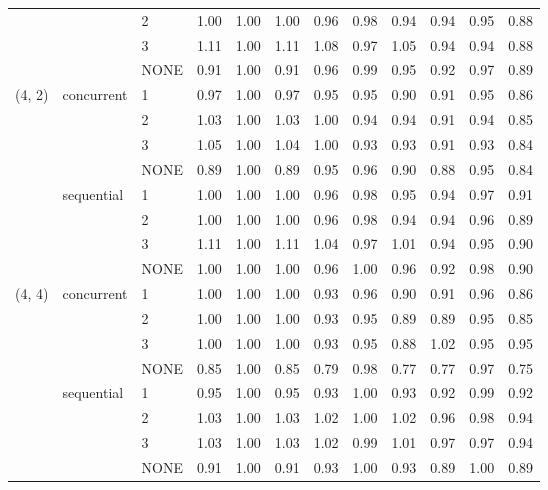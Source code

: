 \begin{tabular}{lllrrrrrrrrr}
       &            & 2 &     1.00 &     1.00 &  1.00 &     0.96 &     0.98 &  0.94 &     0.94 &     0.95 &  0.88 \\
       &            & 3 &     1.11 &     1.00 &  1.11 &     1.08 &     0.97 &  1.05 &     0.94 &     0.94 &  0.88 \\
       &            & NONE &     0.91 &     1.00 &  0.91 &     0.96 &     0.99 &  0.95 &     0.92 &     0.97 &  0.89 \\
(4, 2) & concurrent & 1 &     0.97 &     1.00 &  0.97 &     0.95 &     0.95 &  0.90 &     0.91 &     0.95 &  0.86 \\
       &            & 2 &     1.03 &     1.00 &  1.03 &     1.00 &     0.94 &  0.94 &     0.91 &     0.94 &  0.85 \\
       &            & 3 &     1.05 &     1.00 &  1.04 &     1.00 &     0.93 &  0.93 &     0.91 &     0.93 &  0.84 \\
       &            & NONE &     0.89 &     1.00 &  0.89 &     0.95 &     0.96 &  0.90 &     0.88 &     0.95 &  0.84 \\
       & sequential & 1 &     1.00 &     1.00 &  1.00 &     0.96 &     0.98 &  0.95 &     0.94 &     0.97 &  0.91 \\
       &            & 2 &     1.00 &     1.00 &  1.00 &     0.96 &     0.98 &  0.94 &     0.94 &     0.96 &  0.89 \\
       &            & 3 &     1.11 &     1.00 &  1.11 &     1.04 &     0.97 &  1.01 &     0.94 &     0.95 &  0.90 \\
       &            & NONE &     1.00 &     1.00 &  1.00 &     0.96 &     1.00 &  0.96 &     0.92 &     0.98 &  0.90 \\
(4, 4) & concurrent & 1 &     1.00 &     1.00 &  1.00 &     0.93 &     0.96 &  0.90 &     0.91 &     0.96 &  0.86 \\
       &            & 2 &     1.00 &     1.00 &  1.00 &     0.93 &     0.95 &  0.89 &     0.89 &     0.95 &  0.85 \\
       &            & 3 &     1.00 &     1.00 &  1.00 &     0.93 &     0.95 &  0.88 &     1.02 &     0.95 &  0.95 \\
       &            & NONE &     0.85 &     1.00 &  0.85 &     0.79 &     0.98 &  0.77 &     0.77 &     0.97 &  0.75 \\
       & sequential & 1 &     0.95 &     1.00 &  0.95 &     0.93 &     1.00 &  0.93 &     0.92 &     0.99 &  0.92 \\
       &            & 2 &     1.03 &     1.00 &  1.03 &     1.02 &     1.00 &  1.02 &     0.96 &     0.98 &  0.94 \\
       &            & 3 &     1.03 &     1.00 &  1.03 &     1.02 &     0.99 &  1.01 &     0.97 &     0.97 &  0.94 \\
       &            & NONE &     0.91 &     1.00 &  0.91 &     0.93 &     1.00 &  0.93 &     0.89 &     1.00 &  0.89 \\
\bottomrule
\end{tabular}
